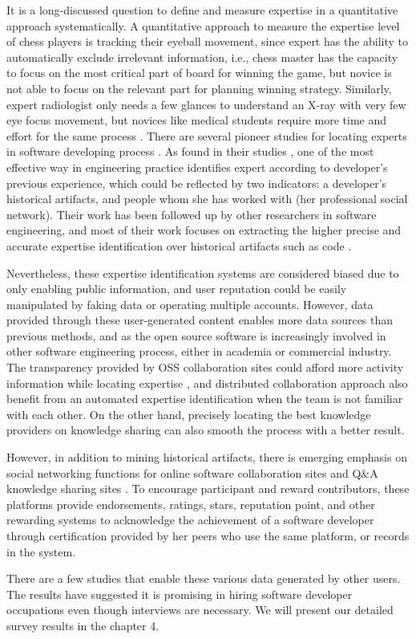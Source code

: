It is a long-discussed question to define and measure expertise in a quantitative approach systematically. A quantitative approach to measure the expertise level of chess players is tracking their eyeball movement, since expert has the ability to automatically exclude irrelevant information, i.e., chess master has the capacity to focus on the most critical part of board for winning the game, but novice is not able to focus on the relevant part for planning winning strategy. Similarly, expert radiologist only needs a few glances to understand an X-ray with very few eye focus movement, but novices like medical students require more time and effort for the same process \citep{bilalić2017neuroscience}. There are several pioneer studies for locating experts in software developing process \cite{mcdonald1998just, mcdonald2000expertise, mockus2002expertise, Reichling2007}. As \citeauthor{mcdonald2000expertise} found in their studies \cite{mcdonald1998just, mcdonald2000expertise}, one of the most effective way in engineering practice identifies expert according to developer's previous experience, which could be reflected by two indicators: a developer's historical artifacts, and people whom she has worked with (her professional social network). Their work has been followed up by other researchers in software engineering, and most of their work focuses on extracting the higher precise and accurate expertise identification over historical artifacts such as code \cite{ Anvik2006who, mockus2002expertise, Servant2011history}.

Nevertheless, these expertise identification systems are considered biased due to only enabling public information, and user reputation could be easily manipulated by faking data or operating multiple accounts. However, data provided through these user-generated content enables more data sources than previous methods, and as the open source software is increasingly involved in other software engineering process, either in academia or commercial industry. The transparency provided by OSS collaboration sites could afford more activity information while locating expertise \cite{Dabbish2012social}, and distributed collaboration approach also benefit from an automated expertise identification when the team is not familiar with each other. On the other hand, precisely locating the best knowledge providers on knowledge sharing can also smooth the process with a better result.

However, in addition to mining historical artifacts, there is emerging emphasis on social networking functions for online software collaboration sites \cite{Dabbish2012social} and Q\&A knowledge sharing sites \cite{vasilescu2014social}. To encourage participant and reward contributors, these platforms provide endorsements, ratings, stars, reputation point, and other rewarding systems to acknowledge the achievement of a software developer through certification provided by her peers who use the same platform, or records in the system. 

There are a few studies \cite{hiring2016sarma} that enable these various data generated by other users. The results have suggested it is promising in hiring software developer occupations even though interviews are necessary. We will present our detailed survey results in the chapter 4.